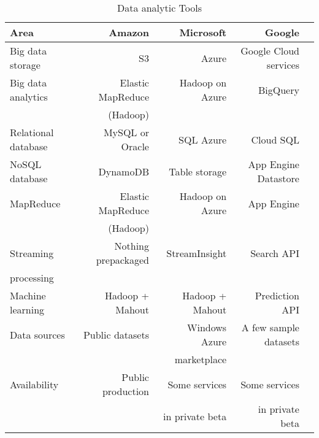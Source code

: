 \begin{longtable}[h]{@{}l *{2}{rr}}
\caption[Data analytic Tools]{Data analytic Tools}
\label{t:data_tools_table}
\\
%   
\toprule%


 {\bfseries Area} & {\bfseries Amazon} & {\bfseries Microsoft} & {\bfseries Google}
\\

\cmidrule[0.4pt](r{0.125em}){1-1}%
\cmidrule[0.4pt](lr{0.125em}){2-4}%


  \endfirsthead

\endhead

    Big data storage & S3 & Azure & Google Cloud services  \\ 
    Big data analytics & Elastic MapReduce & Hadoop on Azure & BigQuery  \\
     &  (Hadoop) &  &   \\ 
    Relational database  & MySQL or Oracle & SQL Azure & Cloud SQL  \\ 
    NoSQL database & DynamoDB & Table storage & App Engine Datastore  \\ 
    MapReduce & Elastic MapReduce & Hadoop on Azure & App Engine  \\ 
     &  (Hadoop) &  &  \\ 
    Streaming  & Nothing prepackaged & StreamInsight & Search API  \\ 
    processing &  &  &   \\ 
    Machine learning & Hadoop + Mahout & Hadoop + Mahout & Prediction API  \\ 
    Data sources & Public datasets & Windows Azure  & A few sample datasets  \\ 
     &   & marketplace &   \\ 
    Availability & Public production & Some services  & Some services \\
     &  & in private beta & in private beta  \\


\bottomrule

\end{longtable}